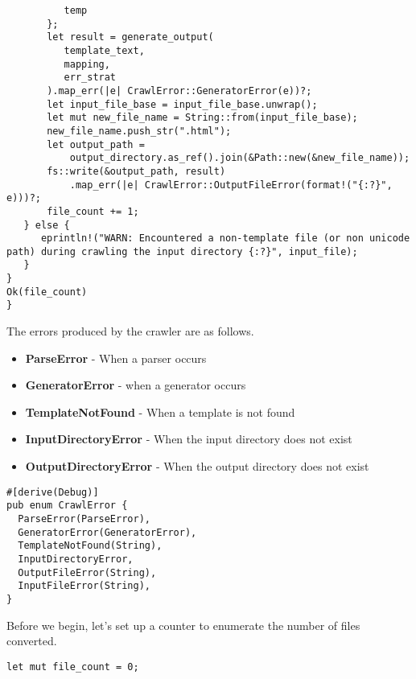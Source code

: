 \documentclass[11pt]{article}
\begin{document}
\begin{verbatim}
          temp
       };
       let result = generate_output(
          template_text, 
          mapping, 
          err_strat
       ).map_err(|e| CrawlError::GeneratorError(e))?;
       let input_file_base = input_file_base.unwrap();
       let mut new_file_name = String::from(input_file_base);
       new_file_name.push_str(".html");
       let output_path = 
           output_directory.as_ref().join(&Path::new(&new_file_name));
       fs::write(&output_path, result)
           .map_err(|e| CrawlError::OutputFileError(format!("{:?}", e)))?;
       file_count += 1;
   } else {
      eprintln!("WARN: Encountered a non-template file (or non unicode path) during crawling the input directory {:?}", input_file);
   }
}
Ok(file_count)
}
\end{verbatim}

The errors produced by the crawler are as follows.
\begin{itemize}
\item \textbf{ParseError} - When a parser occurs
\item \textbf{GeneratorError} - when a generator occurs
\item \textbf{TemplateNotFound} - When a template is not found
\item \textbf{InputDirectoryError} - When the input directory does not exist
\item \textbf{OutputDirectoryError} - When the output directory does not exist
\end{itemize}
\begin{verbatim}
#[derive(Debug)]
pub enum CrawlError {
  ParseError(ParseError),
  GeneratorError(GeneratorError),
  TemplateNotFound(String),
  InputDirectoryError,
  OutputFileError(String),
  InputFileError(String),
}
\end{verbatim}

Before we begin, let's set up a counter to enumerate the number of files converted.
\begin{verbatim}
let mut file_count = 0;
\end{verbatim}
\end{document}
